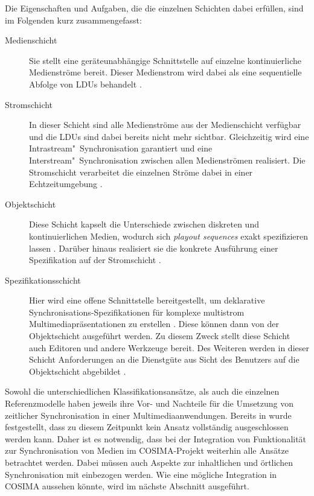   Die Eigenschaften und Aufgaben, die die einzelnen Schichten dabei erfüllen, sind im Folgenden kurz zusammengefasst:
  
  \begin{description}
    \item[Medienschicht] Sie stellt eine geräteunabhängige Schnittstelle auf einzelne kontinuierliche Medienströme bereit. Dieser Medienstrom wird dabei als eine sequentielle Abfolge von LDUs behandelt \citep[S. 603]{multimedia_technologie}.
    \item[Stromschicht] In dieser Schicht sind alle Medienströme aus der Medienschicht verfügbar und die LDUs sind dabei bereits nicht mehr sichtbar. Gleichzeitig wird eine Intra\-stream"~Synchronisation garantiert und eine Interstream"~Synchronisation zwischen allen Medienströmen realisiert. Die Stromschicht verarbeitet die einzelnen Ströme dabei in einer Echtzeitumgebung \citep[S. 604]{multimedia_technologie}.
    \item[Objektschicht] Diese Schicht kapselt die Unterschiede zwischen diskreten und kontinuierlichen Medien, wodurch sich \emph{playout sequences} exakt spezifizieren lassen \citep[S. 99]{meyer1993tms}. Darüber hinaus realisiert sie die konkrete Ausführung einer Spezifikation auf der Stromschicht \citep[S. 605]{multimedia_technologie}.
    \item[Spezifikationsschicht] Hier wird eine offene Schnittstelle bereitgestellt, um deklarative Synchronisations-Spezifikationen für komplexe multistrom Multimediapräsentationen zu erstellen \citep[S. 13]{blakowski1996mss}. Diese können dann von der Objektschicht ausgeführt werden. Zu diesem Zweck stellt diese Schicht auch Editoren und andere Werkzeuge bereit. Des Weiteren werden in dieser Schicht Anforderungen an die Dienstgüte aus Sicht des Benutzers auf die Objektschicht abgebildet \citep[S. 607]{multimedia_technologie}.
  \end{description}
  

  Sowohl die unterschiedlichen Klassifikationsansätze, als auch die einzelnen Referenzmodelle haben jeweils ihre Vor- und Nachteile für die Umsetzung von zeitlicher Synchronisation in einer Multimediaanwendungen. Bereits in \citep[S. 28ff]{bericht} wurde festgestellt, dass zu diesem Zeitpunkt kein Ansatz vollständig ausgeschlossen werden kann. Daher ist es notwendig, dass bei der Integration von Funktionalität zur Synchronisation von Medien im COSIMA-Projekt weiterhin alle Ansätze betrachtet werden. Dabei müssen auch Aspekte zur inhaltlichen und örtlichen Synchronisation mit einbezogen werden. Wie eine mögliche Integration in COSIMA aussehen könnte, wird im nächste Abschnitt ausgeführt.

